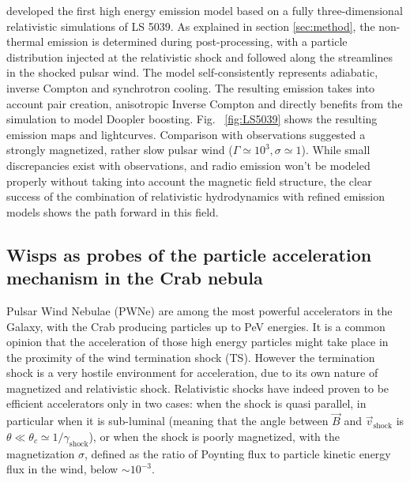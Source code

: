 
\citet{2015A&A...581A..27D} developed the first high energy emission model based on a fully three-dimensional relativistic simulations of LS 5039.  As explained in section \ref{sec:method}, the non-thermal emission is determined during post-processing, with a particle distribution injected at the relativistic shock and followed along the streamlines in the shocked pulsar wind. The model self-consistently represents adiabatic, inverse Compton and synchrotron cooling. The resulting emission takes into account pair creation, anisotropic Inverse Compton and directly benefits from the simulation to model Doopler boosting.  Fig. ~\ref{fig:LS5039} shows the resulting emission maps and lightcurves.  Comparison with observations suggested a strongly magnetized, rather slow pulsar wind ($\Gamma\simeq 10^3, \sigma \simeq 1$). While small discrepancies exist with observations, and radio emission won't be modeled properly without taking into account the magnetic field structure, the clear success of the combination of relativistic hydrodynamics with refined emission models shows the path forward in this field.



\subsection{Wisps as probes of the particle acceleration mechanism in the Crab nebula}
Pulsar Wind Nebulae (PWNe) are among the most powerful accelerators in the Galaxy, with the Crab producing particles up to PeV energies. 
It is a common opinion that the acceleration of those high energy particles might take place in the proximity of the wind termination shock (TS). However the termination shock is a very hostile environment for acceleration, due to its own nature of magnetized and relativistic shock. 
Relativistic shocks have indeed proven to be efficient accelerators only in two cases: when the shock is quasi parallel, in particular when it is sub-luminal (meaning that the angle between $\vec{B}$ and $\vec{v}_\mathrm{shock}$ is $\theta\ll\theta_c\simeq 1/\gamma_\mathrm{shock}$), or when the shock is poorly magnetized, with the magnetization $\sigma$, defined as the ratio of Poynting flux to particle kinetic energy flux in the wind, below $\sim 10^{-3}$.

